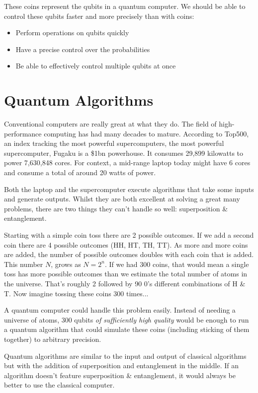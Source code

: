 \documentclass{book}
\begin{document}
These coins represent the qubits in a quantum computer. We should be able to control these qubits faster and more precisely than with coins:
\begin{itemize}
\item Perform operations on qubits quickly 
\item Have a precise control over the probabilities 
\item Be able to effectively control multiple qubits at once 
\end{itemize}


\section{Quantum Algorithms} 

 Conventional computers are really great at what they do. The field of high-performance computing has had many decades to mature. According to Top500, an index tracking the most powerful supercomputers, the most powerful supercomputer, Fugaku is a \$1bn powerhouse. It consumes 29,899 kilowatts to power 7,630,848 cores. For context, a mid-range laptop today might have 6 cores and consume a total of around 20 watts of power. 

 Both the laptop and the supercomputer execute algorithms that take some inputs and generate outputs. Whilst they are both excellent at solving a great many problems, there are two things they can't handle so well: superposition \& entanglement. 

 Starting with a simple coin toss there are 2 possible outcomes. If we add a second coin there are 4 possible outcomes (HH, HT, TH, TT). As more and more coins are added, the number of possible outcomes doubles with each coin that is added. This number $N$, grows as $N = 2^n$. If we had 300 coins, that would mean a single toss has more possible outcomes than we estimate the total number of atoms in the universe. That's roughly 2 followed by 90 0's different combinations of H \& T. Now imagine tossing these coins 300 times...

 A quantum computer could handle this problem easily. Instead of needing a universe of atoms, 300 qubits \textit{of sufficiently high quality} would be enough to run a quantum algorithm that could simulate these coins (including sticking of them together) to arbitrary precision. 

 Quantum algorithms are similar to the input and output of classical algorithms but with the addition of superposition and entanglement in the middle.  If an algorithm doesn't feature superposition \& entanglement, it would always be better to use the classical computer. 
\end{document}
